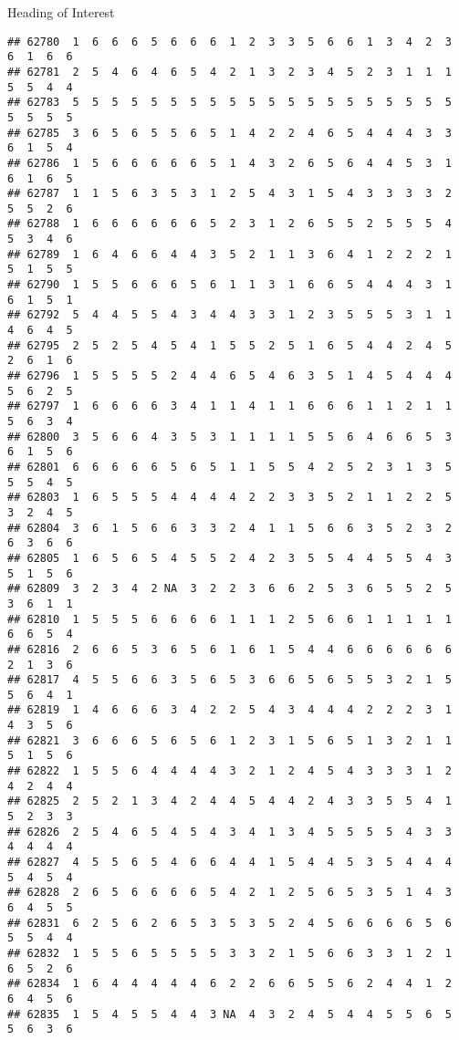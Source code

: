 \documentclass[
  ignorenonframetext,
]{beamer}
\begin{document}
\begin{frame}[fragile]{Heading of Interest}
\begin{verbatim}
## 62780  1  6  6  6  5  6  6  6  1  2  3  3  5  6  6  1  3  4  2  3  6  1  6  6
## 62781  2  5  4  6  4  6  5  4  2  1  3  2  3  4  5  2  3  1  1  1  5  5  4  4
## 62783  5  5  5  5  5  5  5  5  5  5  5  5  5  5  5  5  5  5  5  5  5  5  5  5
## 62785  3  6  5  6  5  5  6  5  1  4  2  2  4  6  5  4  4  4  3  3  6  1  5  4
## 62786  1  5  6  6  6  6  6  5  1  4  3  2  6  5  6  4  4  5  3  1  6  1  6  5
## 62787  1  1  5  6  3  5  3  1  2  5  4  3  1  5  4  3  3  3  3  2  5  5  2  6
## 62788  1  6  6  6  6  6  6  5  2  3  1  2  6  5  5  2  5  5  5  4  5  3  4  6
## 62789  1  6  4  6  6  4  4  3  5  2  1  1  3  6  4  1  2  2  2  1  5  1  5  5
## 62790  1  5  5  6  6  6  5  6  1  1  3  1  6  6  5  4  4  4  3  1  6  1  5  1
## 62792  5  4  4  5  5  4  3  4  4  3  3  1  2  3  5  5  5  3  1  1  4  6  4  5
## 62795  2  5  2  5  4  5  4  1  5  5  2  5  1  6  5  4  4  2  4  5  2  6  1  6
## 62796  1  5  5  5  5  2  4  4  6  5  4  6  3  5  1  4  5  4  4  4  5  6  2  5
## 62797  1  6  6  6  6  3  4  1  1  4  1  1  6  6  6  1  1  2  1  1  5  6  3  4
## 62800  3  5  6  6  4  3  5  3  1  1  1  1  5  5  6  4  6  6  5  3  6  1  5  6
## 62801  6  6  6  6  6  5  6  5  1  1  5  5  4  2  5  2  3  1  3  5  5  5  4  5
## 62803  1  6  5  5  5  4  4  4  4  2  2  3  3  5  2  1  1  2  2  5  3  2  4  5
## 62804  3  6  1  5  6  6  3  3  2  4  1  1  5  6  6  3  5  2  3  2  6  3  6  6
## 62805  1  6  5  6  5  4  5  5  2  4  2  3  5  5  4  4  5  5  4  3  5  1  5  6
## 62809  3  2  3  4  2 NA  3  2  2  3  6  6  2  5  3  6  5  5  2  5  3  6  1  1
## 62810  1  5  5  5  6  6  6  6  1  1  1  2  5  6  6  1  1  1  1  1  6  6  5  4
## 62816  2  6  6  5  3  6  5  6  1  6  1  5  4  4  6  6  6  6  6  6  2  1  3  6
## 62817  4  5  5  6  6  3  5  6  5  3  6  6  5  6  5  5  3  2  1  5  5  6  4  1
## 62819  1  4  6  6  6  3  4  2  2  5  4  3  4  4  4  2  2  2  3  1  4  3  5  6
## 62821  3  6  6  6  5  6  5  6  1  2  3  1  5  6  5  1  3  2  1  1  5  1  5  6
## 62822  1  5  5  6  4  4  4  4  3  2  1  2  4  5  4  3  3  3  1  2  4  2  4  4
## 62825  2  5  2  1  3  4  2  4  4  5  4  4  2  4  3  3  5  5  4  1  5  2  3  3
## 62826  2  5  4  6  5  4  5  4  3  4  1  3  4  5  5  5  5  4  3  3  4  4  4  4
## 62827  4  5  5  6  5  4  6  6  4  4  1  5  4  4  5  3  5  4  4  4  5  4  5  4
## 62828  2  6  5  6  6  6  6  5  4  2  1  2  5  6  5  3  5  1  4  3  6  4  5  5
## 62831  6  2  5  6  2  6  5  3  5  3  5  2  4  5  6  6  6  6  5  6  5  5  4  4
## 62832  1  5  5  6  5  5  5  5  3  3  2  1  5  6  6  3  3  1  2  1  6  5  2  6
## 62834  1  6  4  4  4  4  4  6  2  2  6  6  5  5  6  2  4  4  1  2  6  4  5  6
## 62835  1  5  4  5  5  4  4  3 NA  4  3  2  4  5  4  4  5  5  6  5  5  6  3  6

\end{verbatim}
\end{frame}
\end{document}
